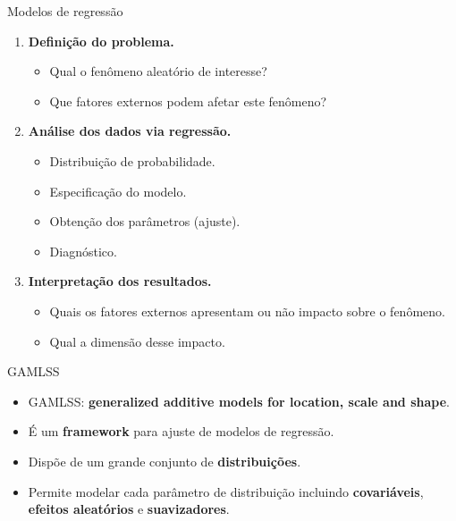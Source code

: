 \documentclass[
  ignorenonframetext,
  serif,
  professionalfont,
  usenames,
  dvipsnames,
  aspectratio = 169]{beamer}
\providecommand{\tightlist}{%
  \setlength{\itemsep}{0pt}\setlength{\parskip}{0pt}}
\renewcommand{\tightlist}{%
  \setlength{\itemsep}{0\baselineskip}
  \setlength{\parskip}{0.25\baselineskip}
}
\begin{document}
\begin{frame}{Modelos de regressão}
\protect\hypertarget{modelos-de-regressuxe3o-5}{}
\begin{enumerate}
\tightlist
\item
  \textbf{Definição do problema.}

  \begin{itemize}
  \tightlist
  \item
    Qual o fenômeno aleatório de interesse?
  \item
    Que fatores externos podem afetar este fenômeno?
  \end{itemize}
\item
  \textbf{Análise dos dados via regressão.}

  \begin{itemize}
  \tightlist
  \item
    Distribuição de probabilidade.
  \item
    Especificação do modelo.
  \item
    Obtenção dos parâmetros (ajuste).
  \item
    Diagnóstico.
  \end{itemize}
\item
  \textbf{Interpretação dos resultados.}

  \begin{itemize}
  \tightlist
  \item
    Quais os fatores externos apresentam ou não impacto sobre o
    fenômeno.
  \item
    Qual a dimensão desse impacto.
  \end{itemize}
\end{enumerate}
\end{frame}

\begin{frame}{GAMLSS}
\protect\hypertarget{gamlss}{}
\begin{itemize}
\item
  GAMLSS:
  \textbf{generalized additive models for location, scale and shape}.
\item
  É um \textbf{framework} para ajuste de modelos de regressão.
\item
  Dispõe de um grande conjunto de \textbf{distribuições}.
\item
  Permite modelar cada parâmetro de distribuição incluindo
  \textbf{covariáveis}, \textbf{efeitos aleatórios} e
  \textbf{suavizadores}.
\end{itemize}
\end{frame}
\end{document}
